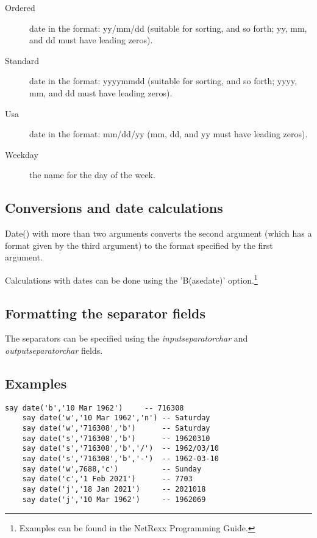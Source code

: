 \begin{description}
\item[Ordered]
date in the format: yy/mm/dd (suitable for sorting, and so forth; yy, mm, and dd must have leading zeros).
\item[Standard]
date in the format: yyyymmdd (suitable for sorting, and so forth; yyyy, mm, and dd must have leading zeros).
\item[Usa]
date in the format: mm/dd/yy (mm, dd, and yy must have leading zeros).
\item[Weekday]
the name for the day of the week.
\end{description}

\subsection{Conversions and date calculations}
Date() with more than two arguments converts the second
argument (which has a format given by the third argument) to the
format specified by the first argument.

Calculations with dates can be done using the 'B(asedate)'
option.\footnote{Examples can be found in the NetRexx Programming Guide.}

\subsection{Formatting the separator fields}
The separators can be specified using the \emph{inputseparatorchar}
and \emph{outputseparatorchar} fields.

\subsection{Examples}

\begin{lstlisting}[label=datessexample,caption=Example of using Date()]
    say date('b','10 Mar 1962')     -- 716308
    say date('w','10 Mar 1962','n') -- Saturday
    say date('w','716308','b')      -- Saturday
    say date('s','716308','b')      -- 19620310 
    say date('s','716308','b','/')  -- 1962/03/10
    say date('s','716308','b','-')  -- 1962-03-10
    say date('w',7688,'c')          -- Sunday
    say date('c','1 Feb 2021')      -- 7703
    say date('j','18 Jan 2021')     -- 2021018
    say date('j','10 Mar 1962')     -- 1962069
\end{lstlisting}

